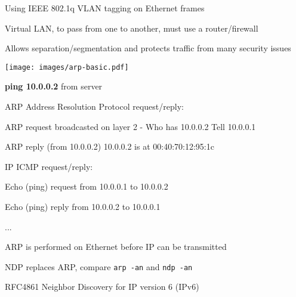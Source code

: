\documentclass[Screen16to9,17pt]{foils}
\begin{document}


\begin{list1}
\item Using IEEE 802.1q  VLAN tagging on Ethernet frames
\item Virtual LAN, to pass from one to another, must use a router/firewall
\item Allows separation/segmentation and protects traffic from many security issues
\end{list1}



\begin{center}
\colorbox{white}{\texttt{[image: images/arp-basic.pdf]}}
\end{center}



\begin{list1}
\item {\bfseries ping 10.0.0.2} from server
\item ARP Address Resolution Protocol request/reply:
  \begin{list2}
  \item ARP request broadcasted on layer 2 - Who has 10.0.0.2 Tell 10.0.0.1
  \item ARP reply (from 10.0.0.2) 10.0.0.2 is at 00:40:70:12:95:1c
  \end{list2}
\item IP ICMP request/reply:
  \begin{list2}
    \item Echo (ping) request from 10.0.0.1 to 10.0.0.2
\item Echo (ping) reply from 10.0.0.2 to 10.0.0.1
\item ...
  \end{list2}
\item ARP is performed on Ethernet before IP can be transmitted
\end{list1}



\begin{list1}
\item NDP replaces ARP, compare \verb+arp -an+ and \verb+ndp -an+
\item RFC4861 Neighbor Discovery for IP version 6 (IPv6)
\end{list1}
\end{document}
